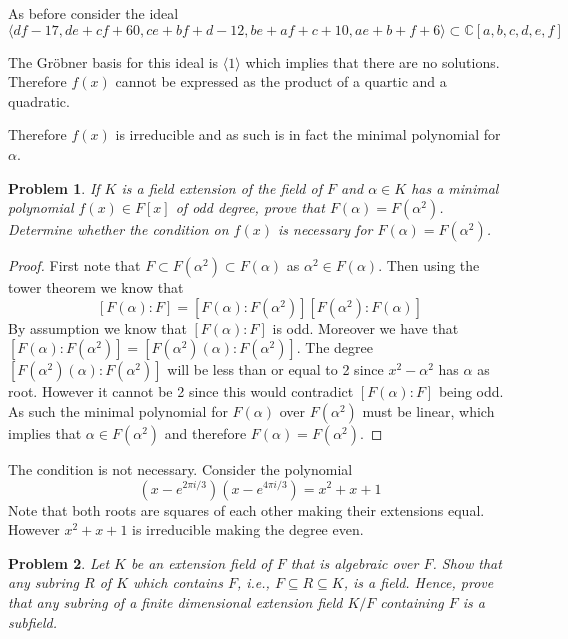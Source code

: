 \documentclass[10pt]{article}
\newcommand{\sk}{\vskip 10mm}
\newcommand{\bb}[1]{\mathbb{#1}}
\theoremstyle{plain}
\newtheorem{problem}{Problem}
\theoremstyle{remark}
\begin{document}
As before consider the ideal
\[ \langle d f - 17, d e + c f + 60, c e + b f + d - 12, b e + a f + c + 10, a e + b + f + 6\rangle
  \subset \bb{C}[a,b,c,d,e,f] \]

The Gr\"obner basis for this ideal is $\langle 1\rangle$ which implies that there are no solutions.
Therefore $f(x)$ cannot be expressed as the product of a quartic and a quadratic.

Therefore $f(x)$ is irreducible and as such is in fact the minimal polynomial for $\alpha$.

\sk

\begin{problem}
  If $K$ is a field extension of the field of $F$ and
  $\alpha \in K$ has a minimal polynomial $f(x) \in F[x]$ of odd degree,
  prove that $F(\alpha) = F(\alpha^2)$. Determine whether the condition
  on $f(x)$ is necessary for $F(\alpha) = F(\alpha^2)$.
\end{problem}

\begin{proof}
  First note that $F\subset F(\alpha^2)\subset F(\alpha)$ as $\alpha^2\in F(\alpha)$. Then using the tower theorem
  we know that
  \[ [F(\alpha):F] = [F(\alpha):F(\alpha^2)][F(\alpha^2):F(\alpha)] \]
  By assumption we know that $[F(\alpha):F]$ is odd. Moreover we have that
  $[F(\alpha):F(\alpha^2)]=[F(\alpha^2)(\alpha):F(\alpha^2)]$. The degree $[F(\alpha^2)(\alpha):F(\alpha^2)]$ will be
  less than or equal to 2 since $x^2-\alpha^2$ has $\alpha$ as root. However it cannot
  be 2 since this would contradict $[F(\alpha):F]$ being odd. As such the
  minimal polynomial for $F(\alpha)$ over $F(\alpha^2)$ must be linear, which implies
  that $\alpha\in F(\alpha^2)$ and therefore $F(\alpha)=F(\alpha^2)$.
\end{proof}

The condition is not necessary. Consider the polynomial
\[(x-e^{2\pi i/3})(x-e^{4\pi i/3})=x^2+x+1\]
Note that both roots are squares of each other making their extensions equal.
However $x^2+x+1$ is irreducible making the degree even.

\sk

\begin{problem}{6}
  Let $K$ be an extension field of $F$ that is algebraic over $F$.
  Show that any subring $R$ of $K$ which contains $F$, i.e.,
  $F \subseteq R \subseteq K$, is a field. Hence, prove that any subring of
  a finite dimensional extension field $K/F$ containing $F$ is a subfield.
\end{problem}
\end{document}
